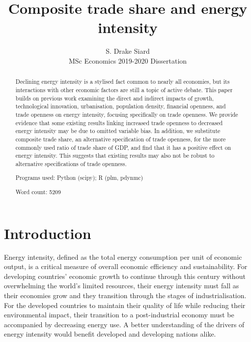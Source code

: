 \documentclass[12pt,a4paper]{article}
\title{Composite trade share and energy intensity}
\author{S. Drake Siard\\
MSc Economics 2019-2020 Dissertation}
\date{}
\newcommand{\pkg}[1]{{\fontseries{b}\selectfont #1}}
\begin{document}
\maketitle

\begin{abstract}
Declining energy intensity is a stylised fact common to nearly all economies, but its interactions with other economic factors are still a topic of active debate.
This paper builds on previous work examining the direct and indirect impacts of growth, technological innovation, urbanisation, population density, financial openness, and trade openness on energy intensity, focusing specifically on trade openness. 
We provide evidence that some existing results linking increased trade openness to decreased energy intensity may be due to omitted variable bias.
In addition, we substitute composite trade share, an alternative specification of trade openness, for the more commonly used ratio of trade share of GDP, and find that it has a positive effect on energy intensity.
This suggests that existing results may also not be robust to alternative specifications of trade openness.

Programs used: Python (\pkg{scipy}); R (\pkg{plm}, \pkg{pdynmc})

Word count: 5209
 
\end{abstract}

\pagebreak

\tableofcontents

\pagebreak

\listoffigures
\listoftables

\pagebreak

\section{Introduction}\label{sec:introduction}

Energy intensity, defined as the total energy consumption per unit of economic output, is a critical measure of overall economic efficiency and sustainability.
For developing countries' economic growth to continue through this century without overwhelming the world's limited resources, their energy intensity must fall as their economies grow and they transition through the stages of industrialisation.
For the developed countries to maintain their quality of life while reducing their environmental impact, their transition to a post-industrial economy must be accompanied by decreasing energy use.
A better understanding of the drivers of energy intensity would benefit developed and developing nations alike.
\end{document}
